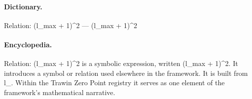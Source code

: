 \paragraph{Dictionary.}
Relation: (l\_max + 1)\textasciicircum{}2 — (l\_max + 1)\textasciicircum{}2

\paragraph{Encyclopedia.}
Relation: (l\_max + 1)\textasciicircum{}2 is a symbolic expression, written (l\_max + 1)\textasciicircum{}2. It introduces a symbol or relation used elsewhere in the framework. It is built from l\_. Within the Trawin Zero Point registry it serves as one element of the framework's mathematical narrative.

